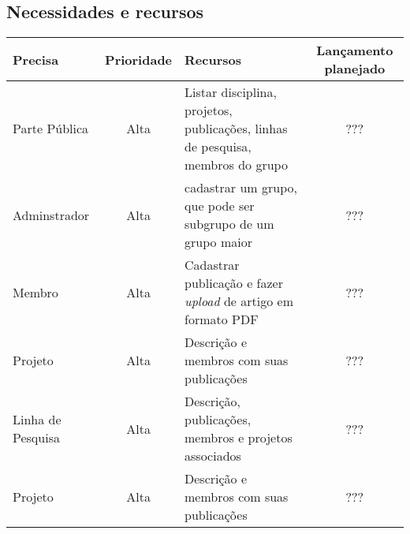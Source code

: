 \documentclass[11pt, a4paper]{article}
\begin{document}
        \subsection{Necessidades e recursos}
            \begin{tabular}{| l | c | p{5cm} | c |}
                \hline
                Precisa & Prioridade & Recursos & Lançamento planejado \\ \hline
                Parte Pública & Alta & Listar disciplina, projetos, publicações, linhas de pesquisa, membros do grupo & ???\\ \hline
                Adminstrador & Alta & cadastrar um grupo, que 
                pode ser subgrupo de um grupo maior & ???\\ \hline
                Membro & Alta & Cadastrar publicação e fazer 
                \emph{upload} de artigo em formato PDF & ???\\ \hline
                Projeto & Alta & Descrição e membros com suas 
                publicações & ???\\ \hline
                Linha de Pesquisa & Alta & Descrição, publicações, 
                membros e projetos associados & ???\\ \hline
                Projeto & Alta & Descrição e membros com suas 
                publicações & ???\\ \hline
                \hline
            \end{tabular}
                
            


    
\end{document}
